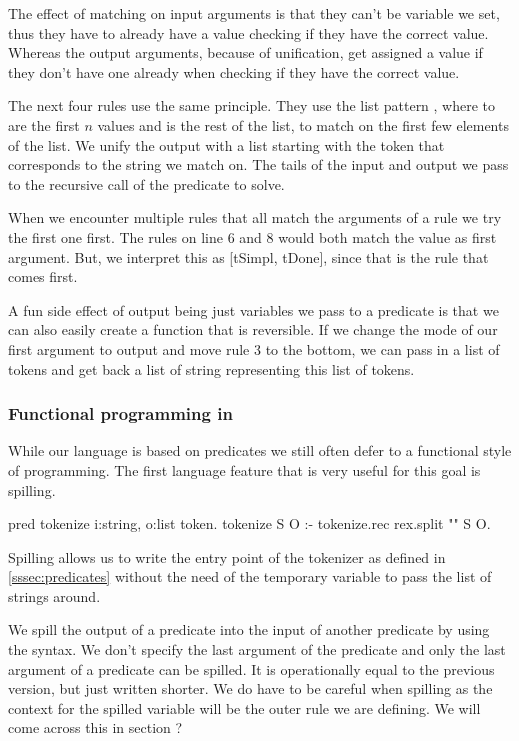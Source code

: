 \documentclass[thesis.tex]{subfiles}
\begin{document}
{{{The effect of matching on input arguments is that they can't be variable we set, thus they have to already have a value checking if they have the correct value. Whereas the output arguments, because of unification, get assigned a value if they don't have one already when checking if they have the correct value.

The next four rules use the same principle. They use the list pattern \elpiinline{[E1, ..., En | TL]}, where  to  are the first $n$ values and  is the rest of the list, to match on the first few elements of the list. We unify the output with a list starting with the token that corresponds to the string we match on. The tails of the input and output we pass to the recursive call of the predicate to solve.

When we encounter multiple rules that all match the arguments of a rule we try the first one first. The rules on line 6 and 8 would both match the value \elpiinline{["/", "/", "="]} as first argument. But, we interpret this as [tSimpl, tDone], since that is the rule that comes first.

A fun side effect of output being just variables we pass to a predicate is that we can also easily create a function that is reversible. If we change the mode of our first argument to output and move rule 3 to the bottom, we can pass in a list of tokens and get back a list of string representing this list of tokens.

\subsubsection{Functional programming in \elpi}
While our language is based on predicates we still often defer to a functional style of programming. The first language feature that is very useful for this goal is spilling.
\begin{elpicode}
  pred tokenize i:string, o:list token.
  tokenize S O :- tokenize.rec {rex.split "" S} O.
\end{elpicode}
Spilling allows us to write the entry point of the tokenizer as defined in \cref*{sssec:predicates} without the need of the temporary variable to pass the list of strings around.

We spill the output of a predicate into the input of another predicate by using the \elpiinline{{ }} syntax. We don't specify the last argument of the predicate and only the last argument of a predicate can be spilled. It is operationally equal to the previous version, but just written shorter. We do have to be careful when spilling as the context for the spilled variable will be the outer rule we are defining. We will come across this in section ?

}}}
\end{document}
